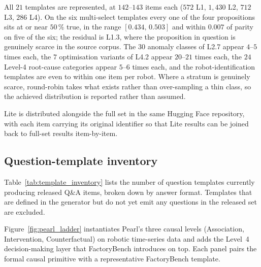 All $21$ templates are represented, at $142$--$143$ items each ($572$ L1,
$1{,}430$ L2, $712$ L3, $286$ L4). On the six multi-select templates every one
of the four propositions sits at or near $50\,\%$ true, in the range
$[0.434,\,0.503]$ and within $0.007$ of parity on five of the six; the residual
is L1.3, where the proposition in question is genuinely scarce in the source
corpus. The $30$ anomaly classes of L2.7 appear $4$--$5$ times each, the $7$
optimisation variants of L4.2 appear $20$--$21$ times each, the $24$ Level-4
root-cause categories appear $5$--$6$ times each, and the robot-identification
templates are even to within one item per robot. Where a stratum is genuinely
scarce, round-robin takes what exists rather than over-sampling a thin class,
so the achieved distribution is reported rather than assumed.

Lite is distributed alongside the full set in the same Hugging Face repository,
with each item carrying its original identifier so that Lite results can be
joined back to full-set results item-by-item.

\subsection{Question-template inventory}
\label{app:templates}
Table~\ref{tab:template_inventory} lists the number of question templates currently producing released Q\&A items, broken down by answer format. Templates that are defined in the generator but do not yet emit any questions in the released set are excluded.

Figure~\ref{fig:pearl_ladder} instantiates Pearl's three causal levels (Association, Intervention, Counterfactual) on robotic time-series data and adds the Level~4 decision-making layer that FactoryBench introduces on top. Each panel pairs the formal causal primitive with a representative FactoryBench template.

